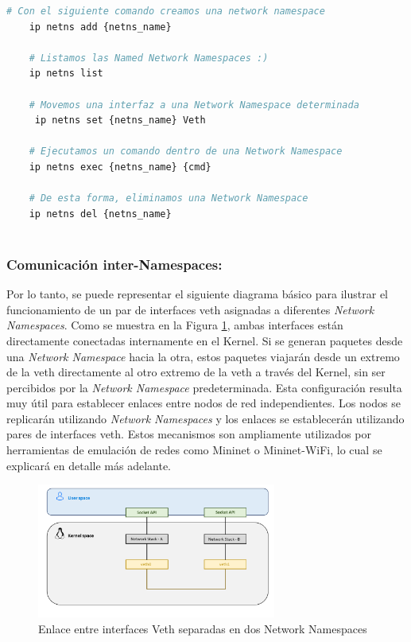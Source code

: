 \begin{lstlisting}[language= bash, style=Consola, caption={Casos de uso de las Netns},label=code:iproute2_ns]
    # Con el siguiente comando creamos una network namespace
    ip netns add {netns_name}
    
    # Listamos las Named Network Namespaces :)
    ip netns list
    
    # Movemos una interfaz a una Network Namespace determinada
     ip netns set {netns_name} Veth
    
    # Ejecutamos un comando dentro de una Network Namespace
    ip netns exec {netns_name} {cmd}
    
    # De esta forma, eliminamos una Network Namespace
    ip netns del {netns_name}
    
\end{lstlisting}

\subsubsection{Comunicación inter-Namespaces: }
\label{linuxVeths}

Por lo tanto, se puede representar el siguiente diagrama básico para ilustrar el funcionamiento de un par de interfaces \gls{veth} asignadas a diferentes \textit{Network Namespaces}. Como se muestra en la Figura \ref{fig:linuxNet_veth}, ambas interfaces están directamente conectadas internamente en el Kernel. Si se generan paquetes desde una \textit{Network Namespace} hacia la otra, estos paquetes viajarán desde un extremo de la \gls{veth} directamente al otro extremo de la \gls{veth} a través del Kernel, sin ser percibidos por la \textit{Network Namespace} predeterminada. Esta configuración resulta muy útil para establecer enlaces entre nodos de red independientes. Los nodos se replicarán utilizando \textit{Network Namespaces} y los enlaces se establecerán utilizando pares de interfaces \gls{veth}. Estos mecanismos son ampliamente utilizados por herramientas de emulación de redes como Mininet o Mininet-WiFi, lo cual se explicará en detalle más adelante.

\begin{figure}[ht]
    \centering
    \includegraphics[width=0.7\textwidth]{archivos/img/teoria/user_kernel.png}
    \caption{Enlace entre interfaces Veth separadas en dos Network Namespaces \cite{carrascal2020diseno}}
    \label{fig:linuxNet_veth}
\end{figure}


